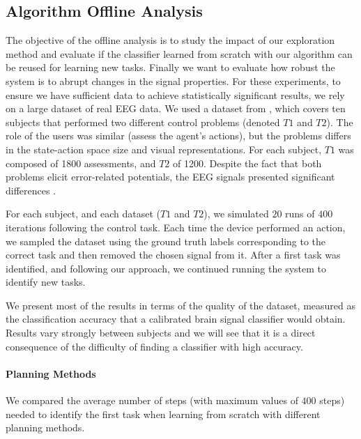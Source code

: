 \documentclass[letterpaper]{article}
\begin{document}
\subsection{Algorithm Offline Analysis}

The objective of the offline analysis is to study the impact of our exploration method and evaluate if the classifier learned from scratch with our algorithm can be reused for learning new tasks. Finally we want to evaluate how robust the system is to abrupt changes in the signal properties. For these experiments, to ensure we have sufficient data to achieve statistically significant results, we rely on a large dataset of real EEG data. We used a dataset from \cite{IturrateErrP13}, which covers ten subjects that performed two different control problems (denoted $T1$ and $T2$). The role of the users was similar (assess the agent's actions), but the problems differs in the state-action space size and visual representations. For each subject, $T1$ was composed of 1800 assessments, and $T2$ of 1200. Despite the fact that both problems elicit error-related potentials, the EEG signals presented significant differences \cite{IturrateErrP13}.

For each subject, and each dataset ($T1$ and $T2$), we simulated $20$ runs of $400$ iterations following the control task. Each time the device performed an action, we sampled the dataset using the ground truth labels corresponding to the correct task and then removed the chosen signal from it. After a first task was identified, and following our approach, we continued running the system to identify new tasks. 

We present most of the results in terms of the quality of the dataset, measured as the classification accuracy that a calibrated brain signal classifier would obtain. Results vary strongly between subjects and we will see that it is a direct consequence of the difficulty of finding a classifier with high accuracy. 

\paragraph{Planning Methods}
We compared the average number of steps (with maximum values of $400$ steps) needed to identify the first task when learning from scratch with different planning methods.
\end{document}
